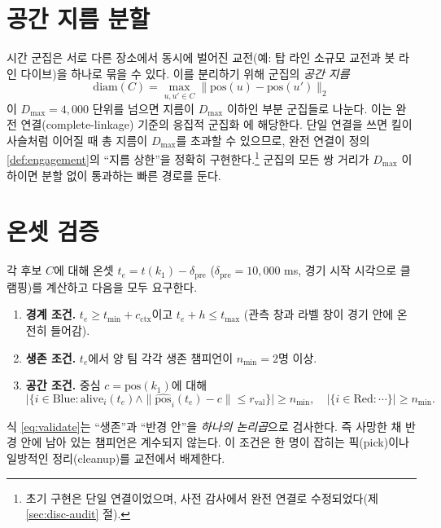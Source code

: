 \section{공간 지름 분할}
\label{sec:loc-spatial}

시간 군집은 서로 다른 장소에서 동시에 벌어진 교전(예: 탑 라인 소규모 교전과 봇 라인 다이브)을 하나로 묶을 수 있다. 이를 분리하기 위해 군집의 \emph{공간 지름}
\begin{equation}
  \mathrm{diam}(C) = \max_{u, u' \in C} \big\|\mathrm{pos}(u) - \mathrm{pos}(u')\big\|_2
\end{equation}
이 $D_{\max} = 4{,}000$ 단위를 넘으면 지름이 $D_{\max}$ 이하인 부분 군집들로 나눈다. 이는 완전 연결(complete-linkage) 기준의 응집적 군집화 \cite{sorensen1948method,defays1977efficient}에 해당한다. 단일 연결을 쓰면 킬이 사슬처럼 이어질 때 총 지름이 $D_{\max}$를 초과할 수 있으므로, 완전 연결이 정의 \ref{def:engagement}의 ``지름 상한''을 정확히 구현한다.\footnote{초기 구현은 단일 연결이었으며, 사전 감사에서 완전 연결로 수정되었다(제 \ref{sec:disc-audit} 절).} 군집의 모든 쌍 거리가 $D_{\max}$ 이하이면 분할 없이 통과하는 빠른 경로를 둔다.

\section{온셋 검증}
\label{sec:loc-validate}

각 후보 $C$에 대해 온셋 $t_e = t(k_1) - \delta_{\mathrm{pre}}$ ($\delta_{\mathrm{pre}} = 10{,}000$ ms, 경기 시작 시각으로 클램핑)를 계산하고 다음을 모두 요구한다.

\begin{enumerate}[leftmargin=2em]
  \item \textbf{경계 조건.} $t_e \ge t_{\min} + c_{\mathrm{ctx}}$이고 $t_e + h \le t_{\max}$ (관측 창과 라벨 창이 경기 안에 온전히 들어감).
  \item \textbf{생존 조건.} $t_e$에서 양 팀 각각 생존 챔피언이 $n_{\min} = 2$명 이상.
  \item \textbf{공간 조건.} 중심 $c = \mathrm{pos}(k_1)$에 대해
  \begin{equation}
    \big|\{i \in \mathrm{Blue} : \mathrm{alive}_i(t_e) \wedge \|\widehat{\mathrm{pos}}_i(t_e) - c\| \le r_{\mathrm{val}}\}\big| \ge n_{\min}, \quad
    \big|\{i \in \mathrm{Red} : \cdots\}\big| \ge n_{\min}.
    \label{eq:validate}
  \end{equation}
\end{enumerate}
식 \eqref{eq:validate}는 ``생존''과 ``반경 안''을 \emph{하나의 논리곱}으로 검사한다. 즉 사망한 채 반경 안에 남아 있는 챔피언은 계수되지 않는다. 이 조건은 한 명이 잡히는 픽(pick)이나 일방적인 정리(cleanup)를 교전에서 배제한다.

